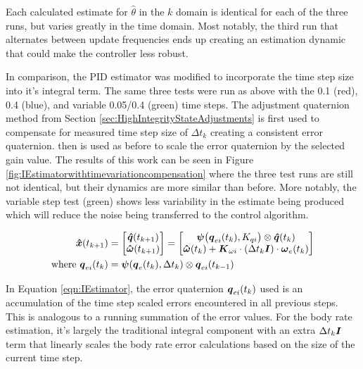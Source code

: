 Each calculated estimate for $\hat{\theta}$ in the $k$ domain is identical for each of the three runs, but varies greatly in the time domain.  Most notably, the third run that alternates between update frequencies ends up creating an estimation dynamic that could make the controller less robust.

In comparison, the PID estimator was modified to incorporate the time step size into it's integral term.  The same three tests were run as above with the 0.1 (red), 0.4 (blue), and variable 0.05/0.4 (green) time steps.  The adjustment quaternion method from Section \ref{sec:HighIntegrityStateAdjustments} is first used to compensate for measured time step size of $\Delta t_{k}$ creating a consistent error quaternion. then is used as before to scale the error quaternion by the selected gain value.  The results of this work can be seen in Figure \ref{fig:IEstimatorwithtimevariationcompensation} where the three test runs are still not identical, but their dynamics are more similar than before.  More notably, the variable step test (green) shows less variability in the estimate being produced which will reduce the noise being transferred to the control algorithm.

\begin{equation}
  \begin{aligned}
    \boldsymbol{\hat{x}}(t_{k+1}) &= \begin{bmatrix} \boldsymbol{\hat{q}}(t_{k+1}) \\ \boldsymbol{\hat{\omega}}(t_{k+1}) \end{bmatrix} =
    \begin{bmatrix} \boldsymbol{\psi}\big(\boldsymbol{q}_{ei}(t_k), K_{qi}\big) \otimes \boldsymbol{\hat{q}}(t_{k}) \\
     \boldsymbol{\hat{\omega}}(t_{k}) + \boldsymbol{K}_{\omega i} \cdot (\Delta t_k \boldsymbol{I})\cdot \boldsymbol{\omega}_e(t_{k}) \end{bmatrix} \\
    \text{where }\boldsymbol{q}_{ei}(t_k) &= \boldsymbol{\psi}(\boldsymbol{q}_e(t_{k}), \Delta t_{k}) \otimes \boldsymbol{q}_{ei}(t_{k-1})
  \end{aligned}
  \label{eqn:IEstimator}
\end{equation}

In Equation \ref{eqn:IEstimator}, the error quaternion $\boldsymbol{q}_{ei}(t_k)$ used is an accumulation of the time step scaled errors encountered in all previous steps.  This is analogous to a running summation of the error values.  For the body rate estimation, it's largely the traditional integral component with an extra $\Delta t_k \boldsymbol{I}$ term that linearly scales the body rate error calculations based on the size of the current time step.

